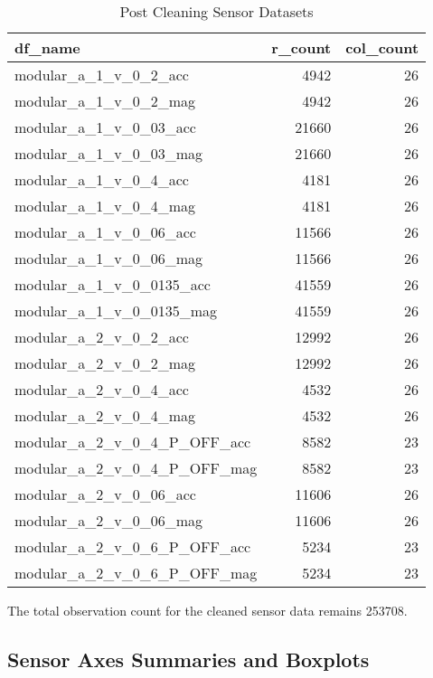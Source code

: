 \documentclass[]{article}
\begin{document}
\begin{table}[!h]

\caption{\label{tab:sensorfiledetails-post}Post Cleaning Sensor Datasets}
\centering
\begin{tabular}[t]{l|r|r}
\hline
df\_name & r\_count & col\_count\\
\hline
modular\_a\_1\_v\_0\_2\_acc & 4942 & 26\\
\hline
modular\_a\_1\_v\_0\_2\_mag & 4942 & 26\\
\hline
modular\_a\_1\_v\_0\_03\_acc & 21660 & 26\\
\hline
modular\_a\_1\_v\_0\_03\_mag & 21660 & 26\\
\hline
modular\_a\_1\_v\_0\_4\_acc & 4181 & 26\\
\hline
modular\_a\_1\_v\_0\_4\_mag & 4181 & 26\\
\hline
modular\_a\_1\_v\_0\_06\_acc & 11566 & 26\\
\hline
modular\_a\_1\_v\_0\_06\_mag & 11566 & 26\\
\hline
modular\_a\_1\_v\_0\_0135\_acc & 41559 & 26\\
\hline
modular\_a\_1\_v\_0\_0135\_mag & 41559 & 26\\
\hline
modular\_a\_2\_v\_0\_2\_acc & 12992 & 26\\
\hline
modular\_a\_2\_v\_0\_2\_mag & 12992 & 26\\
\hline
modular\_a\_2\_v\_0\_4\_acc & 4532 & 26\\
\hline
modular\_a\_2\_v\_0\_4\_mag & 4532 & 26\\
\hline
modular\_a\_2\_v\_0\_4\_P\_OFF\_acc & 8582 & 23\\
\hline
modular\_a\_2\_v\_0\_4\_P\_OFF\_mag & 8582 & 23\\
\hline
modular\_a\_2\_v\_0\_06\_acc & 11606 & 26\\
\hline
modular\_a\_2\_v\_0\_06\_mag & 11606 & 26\\
\hline
modular\_a\_2\_v\_0\_6\_P\_OFF\_acc & 5234 & 23\\
\hline
modular\_a\_2\_v\_0\_6\_P\_OFF\_mag & 5234 & 23\\
\hline
\end{tabular}
\end{table}

The total observation count for the cleaned sensor data remains 253708.

\newpage

\hypertarget{sensor-axes-summaries-and-boxplots}{%
\subsection{Sensor Axes Summaries and
Boxplots}\label{sensor-axes-summaries-and-boxplots}}
\end{document}
